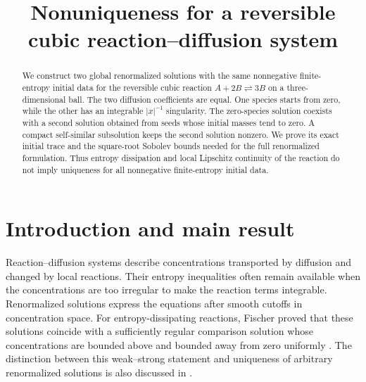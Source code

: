 \documentclass[11pt]{article}
\title{Nonuniqueness for a reversible cubic reaction--diffusion system}
\author{}
\date{}
\theoremstyle{definition}
\begin{document}
\maketitle
\begin{abstract}
We construct two global renormalized solutions with the same nonnegative
finite-entropy initial data for the reversible cubic reaction
$A+2B\rightleftharpoons3B$ on a three-dimensional ball. The two diffusion
coefficients are equal. One species starts from zero, while the other has an
integrable $|x|^{-1}$ singularity. The zero-species solution coexists with a
second solution obtained from seeds whose initial masses tend to zero.
A compact self-similar subsolution keeps the second solution nonzero.
We prove its exact initial trace and the square-root Sobolev bounds needed
for the full renormalized formulation. Thus entropy dissipation and local
Lipschitz continuity of the reaction do not imply uniqueness for all
nonnegative finite-entropy initial data.
\end{abstract}

\section{Introduction and main result}

Reaction--diffusion systems describe concentrations transported by diffusion
and changed by local reactions. Their entropy inequalities often remain
available when the concentrations are too irregular to make the reaction
terms integrable. Renormalized solutions express the equations after smooth
cutoffs in concentration space. For entropy-dissipating reactions, Fischer
proved that these solutions coincide with a sufficiently regular comparison
solution whose concentrations are bounded above and bounded away from zero
uniformly \cite[Definition~2 and Theorem~7, preprint version]{Fischer2017}. The distinction between this
weak--strong statement and uniqueness of arbitrary renormalized solutions
is also discussed in \cite[Remark~1.4]{FFKT2023}.
\end{document}
